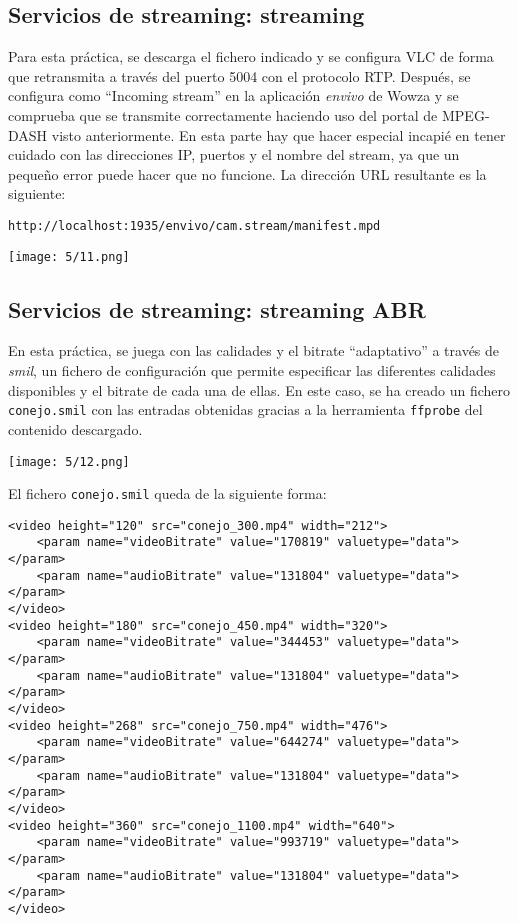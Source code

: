 \subsection{Servicios de streaming: streaming}
Para esta práctica, se descarga el fichero indicado y se configura VLC de forma que retransmita
a través del puerto 5004 con el protocolo RTP{.} Después, se configura como ``Incoming stream''
en la aplicación \textit{envivo} de Wowza y se comprueba que se transmite correctamente haciendo
uso del portal de MPEG-DASH visto anteriormente. En esta parte hay que hacer especial incapié en
tener cuidado con las direcciones IP, puertos y el nombre del stream, ya que un pequeño error
puede hacer que no funcione. La dirección URL resultante es la siguiente:

\begin{verbatim}
http://localhost:1935/envivo/cam.stream/manifest.mpd
\end{verbatim}

\begin{minipage}{\linewidth}
	\centering
	\texttt{[image: 5/11.png]}
	\label{fig:5/11}
\end{minipage}

\subsection{Servicios de streaming: streaming ABR}
En esta práctica, se juega con las calidades y el bitrate ``adaptativo'' a través de
\textit{smil}, un fichero de configuración que permite especificar las diferentes
calidades disponibles y el bitrate de cada una de ellas. En este caso, se ha creado
un fichero \Verb#conejo.smil# con las entradas obtenidas gracias a la herramienta
\Verb#ffprobe# del contenido descargado.

\begin{minipage}{\linewidth}
	\centering
	\texttt{[image: 5/12.png]}
	\label{fig:5/12}
\end{minipage}

El fichero \Verb#conejo.smil# queda de la siguiente forma:

\begin{verbatim}
<video height="120" src="conejo_300.mp4" width="212">
	<param name="videoBitrate" value="170819" valuetype="data"></param>
	<param name="audioBitrate" value="131804" valuetype="data"></param>
</video>
<video height="180" src="conejo_450.mp4" width="320">
	<param name="videoBitrate" value="344453" valuetype="data"></param>
	<param name="audioBitrate" value="131804" valuetype="data"></param>
</video>
<video height="268" src="conejo_750.mp4" width="476">
	<param name="videoBitrate" value="644274" valuetype="data"></param>
	<param name="audioBitrate" value="131804" valuetype="data"></param>
</video>
<video height="360" src="conejo_1100.mp4" width="640">
	<param name="videoBitrate" value="993719" valuetype="data"></param>
	<param name="audioBitrate" value="131804" valuetype="data"></param>
</video>
\end{verbatim}

